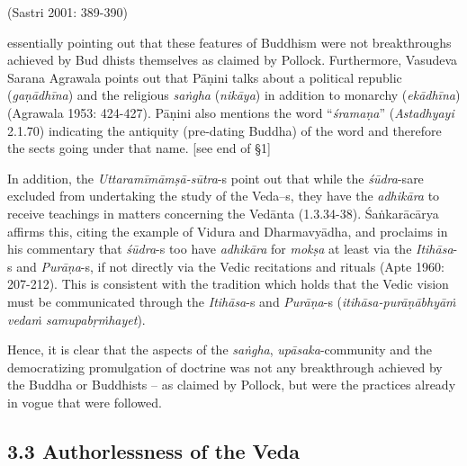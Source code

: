 \vspace{-.6cm}

\begin{flushright}
(Sastri 2001: 389-390)
\end{flushright}

essentially pointing out that these features of Buddhism were not breakthroughs achieved by Bud dhists themselves as claimed by Pollock. Furthermore, Vasudeva Sarana Agrawala points out that Pāṇini talks about a political republic (\textit{gaṇādhīna}) and the religious \textit{saṅgha} (\textit{nikāya}) in addition to monarchy (\textit{ekādhīna}) (Agrawala 1953: 424-427). Pāṇini also mentions the word “\textit{śramaṇa}” (\textit{Astadhyayi} 2.1.70) indicating the antiquity (pre-dating Buddha) of the word and therefore the sects going under that name. [see end of §1]

In addition, the \textit{Uttaramīmāmṣā-sūtra}-s point out that while the \textit{śūdra}-s\break are excluded from undertaking the study of the Veda--s, they have the \textit{adhikāra} to receive teachings in matters concerning the Vedānta (1.3.34-38). Śaṅkarācārya affirms this, citing the example of Vidura and Dharmavyādha, and proclaims in his commentary that \textit{śūdra}-s too have \textit{adhikāra} for \textit{mokṣa} at least via the \textit{Itihāsa}-s and \textit{Purāṇa}-s, if not directly via the Vedic recitations and rituals (Apte 1960: 207-212). This is consistent with the tradition which holds that the Vedic vision must be communicated through the \textit{Itihāsa}-s and \textit{Purāṇa}-s (\textit{itihāsa-purāṇābhyāṁ vedaṁ samupabṛṁhayet}).

Hence, it is clear that the aspects of the \textit{saṅgha}, \textit{upāsaka}-community and the democratizing promulgation of doctrine was not any breakthrough achieved by the Buddha or Buddhists – as claimed by Pollock, but were the practices already in vogue that were followed.


\subsection*{3.3 Authorlessness of the Veda}

